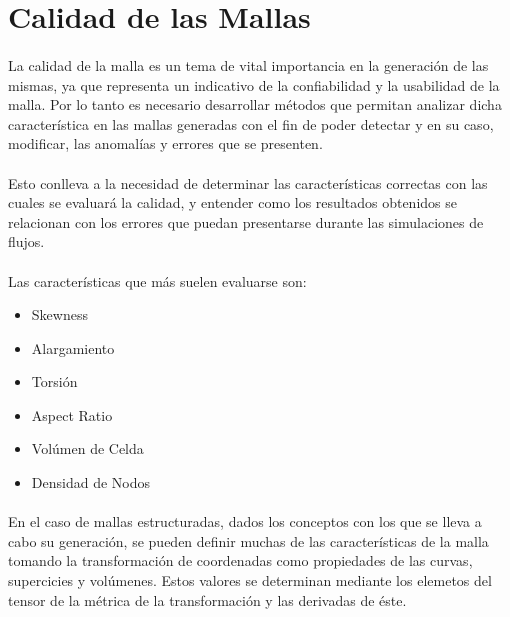 \documentclass[letterpaper, openright, 12pt]{book}
\begin{document}
    \section{Calidad de las Mallas}
    \paragraph*{}
    La calidad de la malla es un tema de vital importancia en la generación
    de las mismas, ya que representa un indicativo de la confiabilidad y la
    usabilidad de la malla. Por lo tanto es necesario desarrollar métodos
    que permitan analizar dicha característica en las mallas generadas con
    el fin de poder detectar y en su caso, modificar, las anomalías y errores
    que se presenten.

    \paragraph*{}
    Esto conlleva a la necesidad de determinar las características correctas
    con las cuales se evaluará la calidad, y entender como los resultados
    obtenidos se relacionan con los errores que puedan presentarse durante
    las simulaciones de flujos.

    \paragraph*{}
    Las características que más suelen evaluarse son:
    \begin{itemize}
        \item Skewness
        \item Alargamiento
        \item Torsión
        \item Aspect Ratio
        \item Volúmen de Celda
        \item Densidad de Nodos
    \end{itemize}

    \paragraph*{}
    En el caso de mallas estructuradas, dados los conceptos con los que se
    lleva a cabo su generación, se pueden definir muchas de las
    características de la malla tomando la transformación de coordenadas
    como propiedades de las curvas, supercicies y volúmenes. Estos valores
    se determinan mediante los elemetos del tensor de la métrica de la
    transformación y las derivadas de éste. \cite{vladimir-grid}
\end{document}
